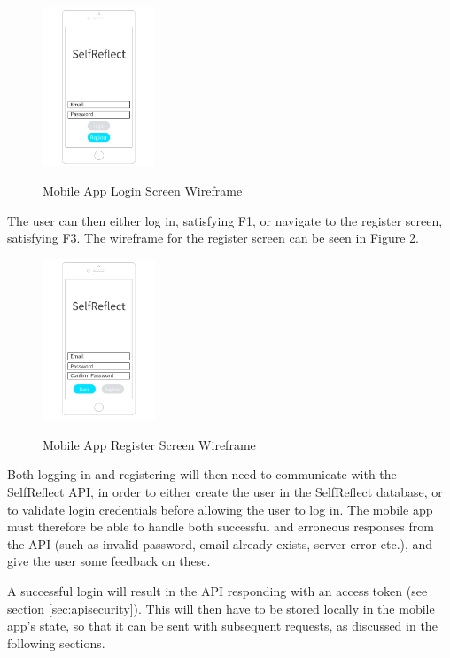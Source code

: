 \documentclass[11pt,openright,a4paper]{report}
\begin{document}
\begin{figure}[ht]
\centering
\caption{Mobile App Login Screen Wireframe}
\includegraphics[width=0.3\textwidth]{i/mobilelogin.png}
\label{fig:mobilelogin}
\end{figure}

The user can then either log in, satisfying F1, or navigate to the register screen, satisfying F3. The wireframe for the register screen can be seen in Figure \ref{fig:mobileregister}.

\begin{figure}[ht]
\centering
\caption{Mobile App Register Screen Wireframe}
\includegraphics[width=0.3\textwidth]{i/mobileregister.png}
\label{fig:mobileregister}
\end{figure}

Both logging in and registering will then need to communicate with the SelfReflect API, in order to either create the user in the SelfReflect database, or to validate login credentials before allowing the user to log in. The mobile app must therefore be able to handle both successful and erroneous responses from the API (such as invalid password, email already exists, server error etc.), and give the user some feedback on these.

A successful login will result in the API responding with an access token (see section \ref{sec:apisecurity}). This will then have to be stored locally in the mobile app's state, so that it can be sent with subsequent requests, as discussed in the following sections.
\end{document}
